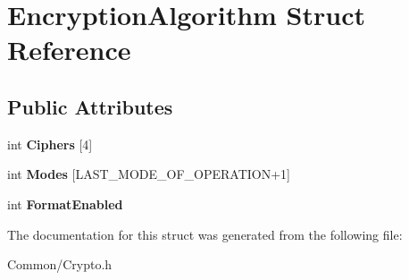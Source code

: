 \hypertarget{struct_encryption_algorithm}{}\section{Encryption\+Algorithm Struct Reference}
\label{struct_encryption_algorithm}
\subsection*{Public Attributes}
\begin{DoxyCompactItemize}
\item 
\mbox{\label{struct_encryption_algorithm_ad6407023c29de4a999e2d8a8a57a4571}} 
int {\bfseries Ciphers} \mbox{[}4\mbox{]}
\item 
\mbox{\label{struct_encryption_algorithm_ab11ca9da00274463017bd1b37d8b7ca1}} 
int {\bfseries Modes} \mbox{[}L\+A\+S\+T\+\_\+\+M\+O\+D\+E\+\_\+\+O\+F\+\_\+\+O\+P\+E\+R\+A\+T\+I\+ON+1\mbox{]}
\item 
\mbox{\label{struct_encryption_algorithm_a3396fab4528c46bfde493949d64219c0}} 
int {\bfseries Format\+Enabled}
\end{DoxyCompactItemize}


The documentation for this struct was generated from the following file\+:\begin{DoxyCompactItemize}
\item 
Common/Crypto.\+h\end{DoxyCompactItemize}
